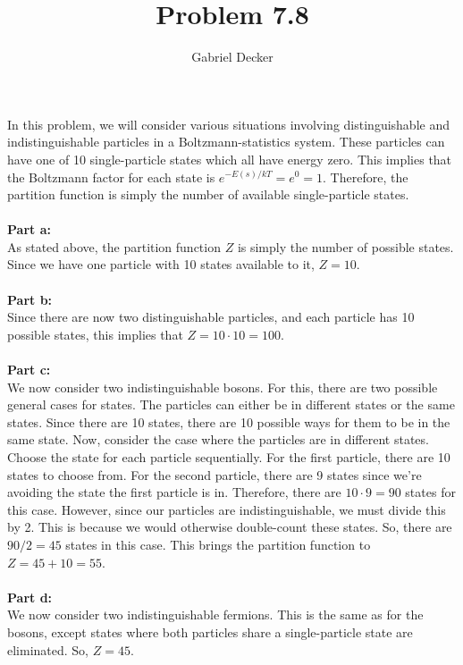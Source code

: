 \documentclass[12pt]{article}
\title{Problem 7.8}
\author{Gabriel Decker}
\begin{document}
\maketitle
\begin{flushleft}



In this problem, we will consider various situations involving distinguishable and indistinguishable particles in a Boltzmann-statistics system.
These particles can have one of 10 single-particle states which all have energy zero.
This implies that the Boltzmann factor for each state is $e^{-E(s)/kT}=e^0=1$.
Therefore, the partition function is simply the number of available single-particle states.\\~\\

\textbf{Part a:}\\
As stated above, the partition function $Z$ is simply the number of possible states.
Since we have one particle with 10 states available to it, $Z=10$.\\~\\

\textbf{Part b:}\\
Since there are now two distinguishable particles, and each particle has 10 possible states, this implies that $Z=10\cdot10=100$.\\~\\

\textbf{Part c:}\\
We now consider two indistinguishable bosons.
For this, there are two possible general cases for states.
The particles can either be in different states or the same states.
Since there are 10 states, there are 10 possible ways for them to be in the same state.
Now, consider the case where the particles are in different states.
Choose the state for each particle sequentially.
For the first particle, there are 10 states to choose from.
For the second particle, there are 9 states since we're avoiding the state the first particle is in.
Therefore, there are $10\cdot9=90$ states for this case.
However, since our particles are indistinguishable, we must divide this by 2.
This is because we would otherwise double-count these states.
So, there are $90/2=45$ states in this case.
This brings the partition function to $Z=45+10=55$.\\~\\

\textbf{Part d:}\\
We now consider two indistinguishable fermions.
This is the same as for the bosons, except states where both particles share a single-particle state are eliminated.
So, $Z=45$.\\~\\


\end{flushleft}
\end{document}
